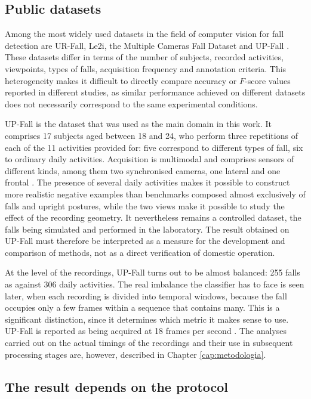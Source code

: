 \subsection{Public datasets}

Among the most widely used datasets in the field of computer vision for fall detection are UR-Fall, Le2i, the Multiple Cameras Fall Dataset and UP-Fall \cite{HO}. These datasets differ in terms of the number of subjects, recorded activities, viewpoints, types of falls, acquisition frequency and annotation criteria. This heterogeneity makes it difficult to directly compare accuracy or \(F\)-score values reported in different studies, as similar performance achieved on different datasets does not necessarily correspond to the same experimental conditions.

UP-Fall is the dataset that was used as the main domain in this work. It comprises 17 subjects aged between 18 and 24, who perform three repetitions of each of the 11 activities provided for: five correspond to different types of fall, six to ordinary daily activities. Acquisition is multimodal and comprises sensors of different kinds, among them two synchronised cameras, one lateral and one frontal \cite{MV}.
The presence of several daily activities makes it possible to construct more realistic negative examples than benchmarks composed almost exclusively of falls and upright postures, while the two views make it possible to study the effect of the recording geometry. It nevertheless remains a controlled dataset, the falls being simulated and performed in the laboratory. The result obtained on UP-Fall must therefore be interpreted as a measure for the development and comparison of methods, not as a direct verification of domestic operation.

At the level of the recordings, UP-Fall turns out to be almost balanced: 255 falls as against 306 daily activities. The real imbalance the classifier has to face is seen later, when each recording is divided into temporal windows, because the fall occupies only a few frames within a sequence that contains many. This is a significant distinction, since it determines which metric it makes sense to use.
UP-Fall is reported as being acquired at 18 frames per second \cite{MV}.
The analyses carried out on the actual timings of the recordings and their use in subsequent processing stages are, however, described in Chapter \ref{cap:metodologia}.

\subsection{The result depends on the protocol}

